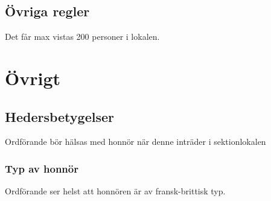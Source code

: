 \documentclass{../resources/dgovdoc}
\begin{document}
\subsection{Övriga regler}

Det får max vistas 200 personer i lokalen. 

\section{Övrigt}

\subsection{Hedersbetygelser}

Ordförande bör hälsas med honnör när denne inträder i sektionlokalen

\subsubsection{Typ av honnör}

Ordförande ser helst att honnören är av fransk-brittisk typ.
\end{document}
